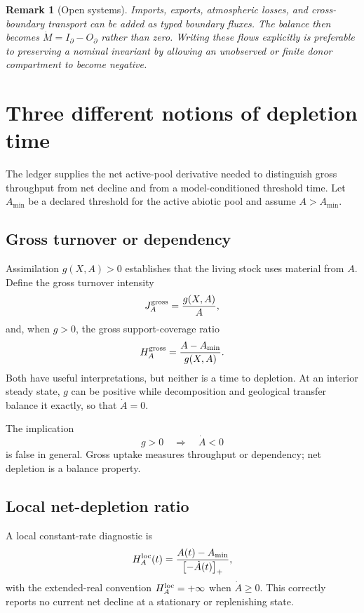 \documentclass[11pt]{article}
\newtheorem{remark}{Remark}
\newcommand{\pos}[1]{\left[#1\right]_+}
\begin{document}
\begin{remark}[Open systems]
Imports, exports, atmospheric losses, and cross-boundary transport can be added as typed boundary fluxes. The balance then becomes $\dot M=I_{\partial}-O_{\partial}$ rather than zero. Writing these flows explicitly is preferable to preserving a nominal invariant by allowing an unobserved or finite donor compartment to become negative.
\end{remark}

\section{Three different notions of depletion time}

The ledger supplies the net active-pool derivative needed to distinguish gross throughput from net decline and from a model-conditioned threshold time. Let $A_{\min}$ be a declared threshold for the active abiotic pool and assume $A>A_{\min}$.

\subsection{Gross turnover or dependency}

Assimilation $g(X,A)>0$ establishes that the living stock uses material from $A$. Define the gross turnover intensity
\begin{equation}
J_A^{\rm gross}=\frac{g(X,A)}{A},
\label{eq:gross-intensity}
\end{equation}
and, when $g>0$, the gross support-coverage ratio
\begin{equation}
H_A^{\rm gross}=\frac{A-A_{\min}}{g(X,A)}.
\label{eq:gross-coverage}
\end{equation}
Both have useful interpretations, but neither is a time to depletion. At an interior steady state, $g$ can be positive while decomposition and geological transfer balance it exactly, so that $\dot A=0$.

The implication
\[
g>0\quad\Longrightarrow\quad\dot A<0
\]
is false in general. Gross uptake measures throughput or dependency; net depletion is a balance property.

\subsection{Local net-depletion ratio}

A local constant-rate diagnostic is
\begin{equation}
H_A^{\rm loc}(t)=
\frac{A(t)-A_{\min}}{\pos{-\dot A(t)}},
\label{eq:local-horizon}
\end{equation}
with the extended-real convention $H_A^{\rm loc}=+\infty$ when $\dot A\ge0$. This correctly reports no current net decline at a stationary or replenishing state.
\end{document}
